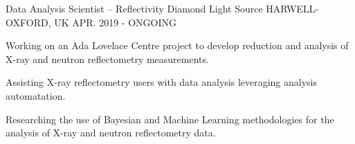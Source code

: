 \begin{cventries}
  \cventry
    {Data Analysis Scientist -- Reflectivity}
    {Diamond Light Source}
    {HARWELL-OXFORD, UK}
    {APR. 2019 - ONGOING}
    {
      \begin{cvitems}
        \item {Working on an Ada Lovelace Centre project to develop reduction and analysis of X-ray and neutron reflectometry measurements.}
        \item {Assisting X-ray reflectometry users with data analysis leveraging analysis automatation.}
        \item {Researching the use of Bayesian and Machine Learning methodologies for the analysis of X-ray and neutron reflectometry data.}
      \end{cvitems}
    }
\end{cventries}
